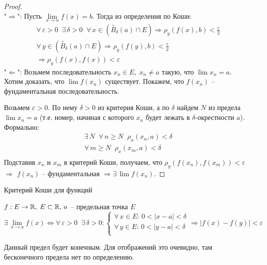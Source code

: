 \begin{proof} \quad \\
    "$\Rightarrow$": Пусть $\lim\limits_{x \to a} f(x) = b$. Тогда из определения по Коши:
    \begin{gather*}
        \forall \, \varepsilon > 0 \;\; \exists \, \delta > 0 \;\; \forall \, x \in (\overset{\circ}{B}_{\delta}(a) \cap E) \Rightarrow \rho_y(f(x), b) < \frac{\varepsilon}{2} \\
        \forall \, y \in (\overset{\circ}{B}_{\delta}(a) \cap E) \Rightarrow \rho_y(f(y), b) < \frac{\varepsilon}{2} \\
        \Rightarrow \rho_y(f(x), f(x)) < \varepsilon
    \end{gather*}
    "$\Leftarrow$": Возьмем последовательность $x_n \in E, \; x_n \neq a$ такую, что $\lim x_n = a$. Хотим доказать, что $\lim f(x_n)$ существует. Покажем, что $f(x_n)$ -- фундаментальная последовательность.

    Возьмем $\varepsilon > 0$. По нему $\delta > 0$ из критерия Коши, а по $\delta$ найдем $N$ из предела $\lim x_n = a$ (т.е. номер, начиная с которого $x_n$ будет лежать в $\delta$-окрестности $a$). Формально:
    \begin{gather*}
        \exists \, N \;\; \forall \, n \geqslant N \;\; \rho_x(x_n, a) < \delta \\
        \forall \, m \geqslant N \;\; \rho_x(x_m, a) < \delta \\
    \end{gather*}
    Подставив $x_n$ и $x_m$ в критерий Коши, получаем, что $\rho_y(f(x_n), f(x_m)) < \varepsilon$
    $\Rightarrow$ $f(x_n)$ -- фундаментальная $\Rightarrow \exists \, \lim f(x_n)$.
\end{proof}

\begin{theorem-non}
    Критерий Коши для функций

$f : E \to \mathbb{R}, \; E \subset \mathbb{R}, \, a$ -- предельная точка $E$
\[ 
\exists \, \lim_{x \to a} f(x) \Longleftrightarrow \forall \, \varepsilon > 0 \;\; \exists \,\delta > 0 : 
\begin{cases} 
    \forall \, x \in E : \, 0 < |x - a| < \delta \\
    \forall \, y \in E : \, 0 < |y - a| < \delta \\
\end{cases}    
    \Rightarrow |f(x) - f(y)| < \varepsilon
\]
\end{theorem-non}
\begin{notice}
    Данный предел будет конечным. Для отображений это очевидно, там бесконечного предела нет по определению.
\end{notice}

